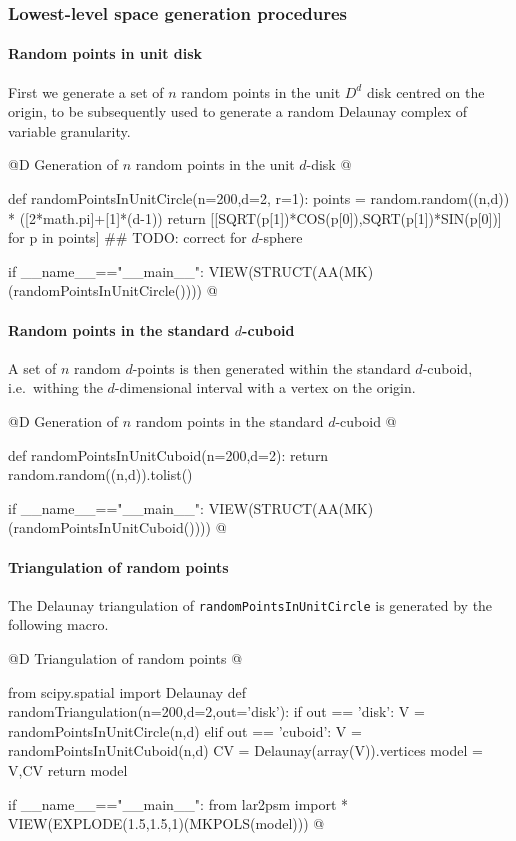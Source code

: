 \documentclass[11pt,oneside]{article}	%
\begin{document}
\subsubsection{Lowest-level space generation procedures}

\paragraph{Random points in unit disk} 
First we generate a  set of $n$ random points in the unit $D^d$ disk centred on the origin, to be subsequently used to generate a random Delaunay complex of variable granularity.

@D Generation of $n$ random points in the unit $d$-disk 
@{def randomPointsInUnitCircle(n=200,d=2, r=1):
	points = random.random((n,d)) * ([2*math.pi]+[1]*(d-1))
	return [[SQRT(p[1])*COS(p[0]),SQRT(p[1])*SIN(p[0])] for p in points]
	## TODO: correct for $d$-sphere

if __name__=="__main__":
	VIEW(STRUCT(AA(MK)(randomPointsInUnitCircle()))) 
@}

\paragraph{Random points in the standard $d$-cuboid} 
A set of $n$ random $d$-points is then generated within the standard $d$-cuboid, i.e.~withing the $d$-dimensional interval with a vertex on the origin.

@D Generation of $n$ random points in the standard $d$-cuboid 
@{def randomPointsInUnitCuboid(n=200,d=2):
	return random.random((n,d)).tolist()

if __name__=="__main__":
	VIEW(STRUCT(AA(MK)(randomPointsInUnitCuboid()))) 
@}



\paragraph{Triangulation of random points} The Delaunay triangulation of \texttt{randomPointsInUnitCircle} is generated by the following macro.


@D Triangulation of random points
@{from scipy.spatial import Delaunay
def randomTriangulation(n=200,d=2,out='disk'):
	if out == 'disk':
		V = randomPointsInUnitCircle(n,d)
	elif out == 'cuboid':
		V = randomPointsInUnitCuboid(n,d)
	CV = Delaunay(array(V)).vertices
	model = V,CV
	return model

if __name__=="__main__":
	from lar2psm import *
	VIEW(EXPLODE(1.5,1.5,1)(MKPOLS(model)))
@}
\end{document}
